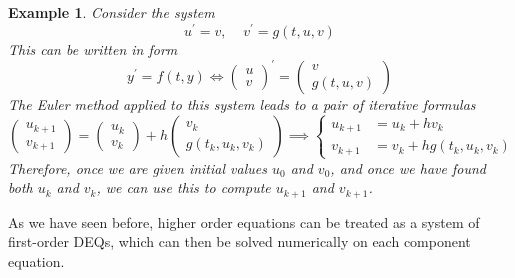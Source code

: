 \documentclass{article}
\newtheorem{example}{Example}[section]
\theoremstyle{remark}
\theoremstyle{definition}
\begin{document}
    \begin{example}
    Consider the system 
    \[u^\prime = v, \;\;\;\; v^\prime = g(t, u, v)\]
    This can be written in form 
    \[y^\prime = f(t, y) \iff \begin{pmatrix} u \\ v \end{pmatrix}^\prime = \begin{pmatrix} v \\ g(t, u, v) \end{pmatrix} \]
    The Euler method applied to this system leads to a pair of iterative formulas 
    \[\begin{pmatrix} u_{k+1} \\ v_{k+1} \end{pmatrix} = \begin{pmatrix} u_k \\ v_k \end{pmatrix} + h \begin{pmatrix} v_k \\ g(t_k, u_k, v_k) \end{pmatrix} \implies \begin{cases} u_{k+1} & = u_k + h v_k \\
    v_{k+1} & = v_k + h g(t_k, u_k, v_k) \end{cases}\]
    Therefore, once we are given initial values $u_0$ and $v_0$, and once we have found both $u_k$ and $v_k$, we can use this to compute $u_{k+1}$ and $v_{k+1}$. 
    \end{example}

    As we have seen before, higher order equations can be treated as a system of first-order DEQs, which can then be solved numerically on each component equation. 
\end{document}
